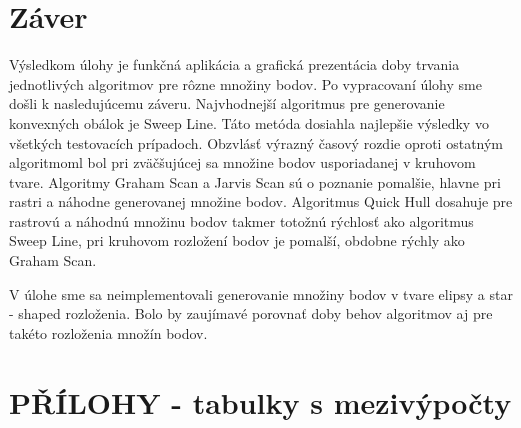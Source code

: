 \documentclass[12pt]{article}
\begin{document}
\section{Záver}
Výsledkom úlohy je funkčná aplikácia a grafická prezentácia doby trvania jednotlivých algoritmov pre rôzne množiny bodov. Po vypracovaní úlohy sme došli k nasledujúcemu záveru. Najvhodnejší algoritmus pre generovanie konvexných obálok je Sweep Line. Táto metóda dosiahla najlepšie výsledky vo všetkých testovacích prípadoch. Obzvlásť výrazný časový rozdie oproti ostatným algoritmoml bol pri zväčšujúcej sa množine bodov usporiadanej v kruhovom tvare. Algoritmy Graham Scan a Jarvis Scan sú o poznanie pomalšie, hlavne pri rastri a náhodne generovanej množine bodov. Algoritmus Quick Hull dosahuje pre rastrovú a náhodnú množinu bodov takmer totožnú rýchlosť ako algoritmus Sweep Line, pri kruhovom rozložení bodov je pomalší, obdobne rýchly ako Graham Scan.

V úlohe sme sa neimplementovali generovanie množiny bodov v tvare  elipsy a star - shaped rozloženia. Bolo by zaujímavé porovnať doby behov algoritmov aj pre takéto rozloženia množín bodov.


\newpage

\listoffigures


\listoftables


\nocite{*}
{}



\section{PŘÍLOHY - tabulky s mezivýpočty}
\label{sec:prilohy}
\end{document}
